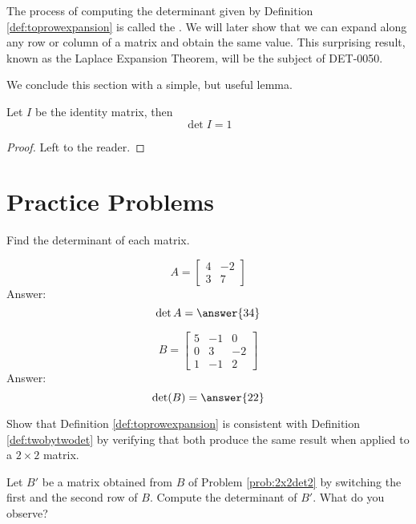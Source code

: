 \documentclass{ximera}
\begin{document}
The process of computing the determinant given by Definition \ref{def:toprowexpansion} is called the .  We will later show that we can expand along any row or column of a matrix and obtain the same value.  This surprising result, known as the Laplace Expansion Theorem, will be the subject of DET-0050.

We conclude this section with a simple, but useful lemma.

\begin{lemma}\label{lemma:detofid} Let $I$ be the identity matrix, then
$$\det{I}=1$$
\end{lemma}
\begin{proof} Left to the reader.
\end{proof}

\section*{Practice Problems}

\begin{problem}
Find the determinant of each matrix.
  \begin{problem}\label{prob:2x2det1}
  $$A=\begin{bmatrix}4&-2\\3&7\end{bmatrix}$$
  Answer:
  $$\det{A}=\answer{34}$$
  \end{problem}
  
  \begin{problem}\label{prob:2x2det2}
  $$B=\begin{bmatrix}5&-1&0\\0&3&-2\\1&-1&2\end{bmatrix}$$
  Answer:
  $$\text{det}(B)=\answer{22}$$
  \end{problem}
\end{problem}

\begin{problem}\label{prob:toprowexp2x2}
Show that Definition \ref{def:toprowexpansion} is consistent with Definition \ref{def:twobytwodet} by verifying that both produce the same result when applied to a $2\times 2$ matrix.
\end{problem}

\begin{problem}\label{prob:detrowswitch}
Let $B'$ be a matrix obtained from $B$ of Problem \ref{prob:2x2det2} by switching the first and the second row of $B$.  Compute the determinant of $B'$.  What do you observe?
\end{problem}
\end{document}
